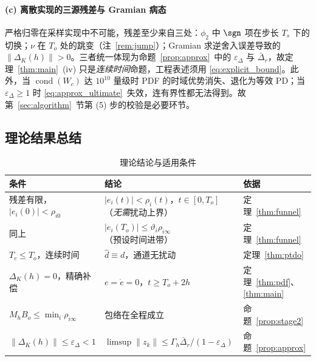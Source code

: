 \paragraph{(c) 离散实现的三源残差与 Gramian 病态}
严格归零在采样实现中不可能，残差至少来自三处：\(\phi_2\) 中 \(\sgn\) 项在步长 \(T_s\) 下的切换；\(\nu\) 在 \(T_o\) 处的跳变（注~\ref{rem:jump}）；Gramian 求逆舍入误差导致的 \(\lVert\Delta_K(h)\rVert>0\)。三者统一体现为命题~\ref{prop:approx}~中的 \(\varepsilon_\Delta\) 与 \(\bar\Delta_r\)，故定理~\ref{thm:main}~(iv) 只是\emph{连续时间}命题，工程表述须用 \eqref{eq:explicit_bound}。此外，当 \(\operatorname{cond}(W_c)\) 达 \(10^{10}\) 量级时 PDF 的时域优势消失、退化为等效 PD；当 \(\varepsilon_\Delta\ge1\) 时 \eqref{eq:approx_ultimate}~失效，连有界性都无法得到。故第~\ref{sec:algorithm}~节第 (5) 步的校验是必要环节。

\subsection{理论结果总结}

\begin{table}[H]
\centering
\caption{理论结论与适用条件}
\label{tab:theory_summary}
\small\begin{tabular}{p{4.4cm}p{6.2cm}p{3.2cm}}
\toprule
条件 & 结论 & 依据 \\
\midrule
残差有限，\(\lvert e_i(0)\rvert<\rho_{i0}\) & \(\lvert e_i(t)\rvert<\rho_i(t)\)，\(t\in[0,T_o]\)（\emph{无需}扰动上界） & 定理~\ref{thm:funnel} \\
同上 & \(\lvert e_i(T_o)\rvert\le\vartheta_i\rho_{i\infty}\)（预设时间进带） & 定理~\ref{thm:funnel} \\
\(T_c\le T_o\)，连续时间 & \(\hat d\equiv d\)，通道无扰动 & 定理~\ref{thm:ptdo} \\
\(\Delta_K(h)=0\)，精确补偿 & \(e=\dot e=0\)，\(t\ge T_o+2h\) & 定理~\ref{thm:pdf}、\ref{thm:main} \\
\(M_hB_o\le\min_i\rho_{i\infty}\) & 包络在全程成立 & 命题~\ref{prop:stage2} \\
\(\lVert\Delta_K(h)\rVert\le\varepsilon_\Delta<1\) & \(\limsup\lVert z_k\rVert\le\Gamma_h\bar\Delta_r/(1-\varepsilon_\Delta)\) & 命题~\ref{prop:approx} \\
\bottomrule
\end{tabular}
\end{table}
